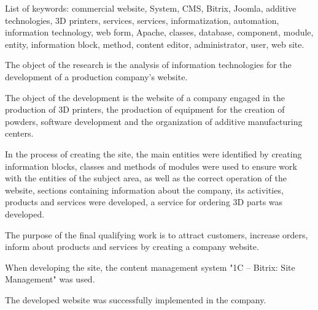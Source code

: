 List of keywords: commercial website, System, CMS, Bitrix, Joomla, additive technologies, 3D printers, services, services, informatization, automation, information technology, web form, Apache, classes, database, component, module, entity, information block, method, content editor, administrator, user, web site.

The object of the research is the analysis of information technologies for the development of a production company's website.

The object of the development is the website of a company engaged in the production of 3D printers, the production of equipment for the creation of powders, software development and the organization of additive manufacturing centers.

In the process of creating the site, the main entities were identified by creating information blocks, classes and methods of modules were used to ensure work with the entities of the subject area, as well as the correct operation of the website, sections containing information about the company, its activities, products and services were developed, a service for ordering 3D parts was developed.

The purpose of the final qualifying work is to attract customers, increase orders, inform about products and services by creating a company website.

When developing the site, the content management system "1C – Bitrix: Site Management" was used.

The developed website was successfully implemented in the company.
